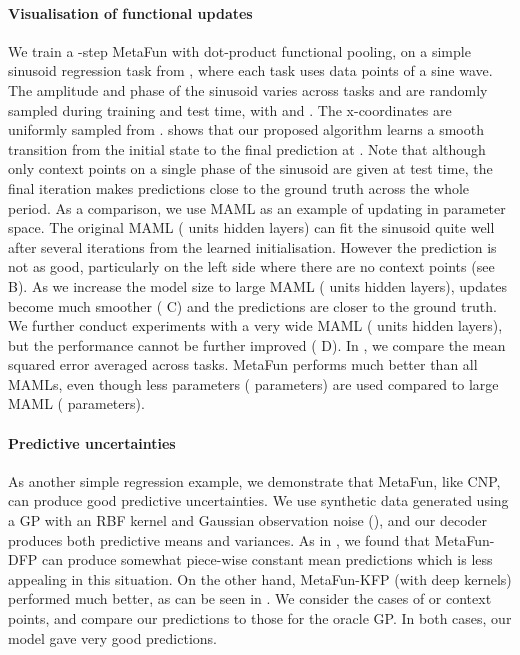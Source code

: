 \documentclass{article}
\theoremstyle{definition}
\begin{document}
\paragraph{Visualisation of functional updates} We train a -step MetaFun with dot-product functional pooling, on a simple sinusoid regression task from \citet{finn2017model}, where each task uses data points of a sine wave. The amplitude  and phase  of the sinusoid varies across tasks and are randomly sampled during training and test time, with  and . The x-coordinates are uniformly sampled from .
 shows that our proposed algorithm learns a smooth transition from the initial state to the final prediction at . Note that although only  context points on a single phase of the sinusoid are given at test time, the final iteration makes predictions close to the ground truth across the whole period.
As a comparison, we use \gls{MAML} as an example of updating in parameter space. The original \gls{MAML} ( units   hidden layers) can fit the sinusoid quite well after several iterations from the learned initialisation. However the prediction is not as good, particularly on the left side where there are no context points (see  B). As we increase the model size to large \gls{MAML} ( units   hidden layers), updates become much smoother ( C) and the predictions are closer to the ground truth. 
We further conduct experiments with a very wide \gls{MAML} ( units   hidden layers), but the performance cannot be further improved ( D). In , we compare the mean squared error averaged across tasks. MetaFun performs much better than all \gls{MAML}s, even though less parameters ( parameters) are used compared to large \gls{MAML} ( parameters).


\paragraph{Predictive uncertainties} As another simple regression example, we demonstrate that MetaFun, like \gls{CNP}, can produce good predictive uncertainties. We use synthetic data generated using a \gls{GP} with an RBF kernel and Gaussian observation noise (), and our decoder produces both predictive means and variances. 
As in \citet{kim2019attentive}, we found that MetaFun-DFP can produce somewhat piece-wise constant mean predictions which is less appealing in this situation. On the other hand, MetaFun-KFP (with deep kernels) performed much better, as can be seen in . We consider the cases of  or  context points, and compare our predictions to those for the oracle \gls{GP}. In both cases, our model gave very good predictions. 
\end{document}
